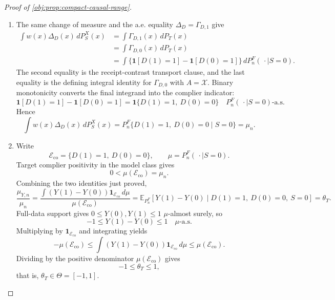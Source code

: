 \begin{proof}[Proof of \cref{obj:prop:compact-causal-range}]
\begin{enumerate}
\item The same change of measure and the a.e. equality \(\Delta_D=\Gamma_{D,1}\) give
\[
\begin{aligned}
\int w(x)\Delta_D(x)\,dP_S^X(x)
&=
\int \Gamma_{D,1}(x)\,dP_T(x)\\
&=
\int \Gamma_{D,0}(x)\,dP_T(x)\\
&=
\int \{\mathbf 1[D(1)=1]-\mathbf 1[D(0)=1]\}\,dP_n^F(\,\cdot\mid S=0).
\end{aligned}
\]
The second equality is the receipt-contrast transport clause, and the last equality is the defining integral identity for \(\Gamma_{D,0}\) with \(A=\mathcal X\).  Binary monotonicity converts the final integrand into the complier indicator:
\[
\mathbf 1[D(1)=1]-\mathbf 1[D(0)=1]
=
\mathbf 1\{D(1)=1,\ D(0)=0\}
\quad
P_n^F(\,\cdot\mid S=0)\text{-a.s.}
\]
Hence
\[
\int w(x)\Delta_D(x)\,dP_S^X(x)
=
P_n^F\{D(1)=1,\ D(0)=0\mid S=0\}
=
\mu_n.
\]

\item Write
\[
\mathcal E_{\mathrm{co}}
=
\{D(1)=1,\ D(0)=0\},
\qquad
\mu=P_n^F(\,\cdot\mid S=0).
\]
Target complier positivity in the model class gives
\[
0<\mu(\mathcal E_{\mathrm{co}})=\mu_n.
\]
Combining the two identities just proved,
\[
\frac{\mu_{Y,n}}{\mu_n}
=
\frac{\int (Y(1)-Y(0))\mathbf 1_{\mathcal E_{\mathrm{co}}}\,d\mu}
{\mu(\mathcal E_{\mathrm{co}})}
=
\mathbb E_{P_n^F}\!\left[
Y(1)-Y(0)\mid D(1)=1,\ D(0)=0,\ S=0
\right]
=
\theta_T .
\]
Full-data support gives \(0\le Y(0),Y(1)\le1\) \(\mu\)-almost surely, so
\[
-1\le Y(1)-Y(0)\le1
\quad \mu\text{-a.s.}
\]
Multiplying by \(\mathbf 1_{\mathcal E_{\mathrm{co}}}\) and integrating yields
\[
-\mu(\mathcal E_{\mathrm{co}})
\le
\int (Y(1)-Y(0))\mathbf 1_{\mathcal E_{\mathrm{co}}}\,d\mu
\le
\mu(\mathcal E_{\mathrm{co}}).
\]
Dividing by the positive denominator \(\mu(\mathcal E_{\mathrm{co}})\) gives
\[
-1\le \theta_T\le1,
\]
that is, \(\theta_T\in\Theta=[-1,1]\). %
\end{enumerate}
\end{proof}

